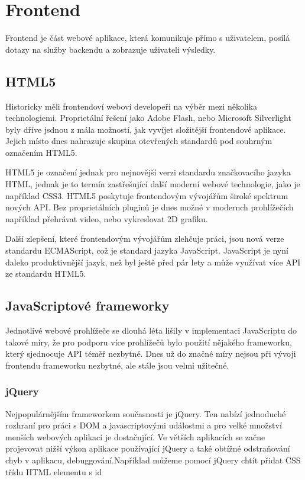 \chapter{Frontend}

Frontend je část webové aplikace, která komunikuje přímo s uživatelem, posílá dotazy na služby backendu a zobrazuje uživateli výsledky.

\section{HTML5}

Historicky měli frontendoví weboví developeři na výběr mezi několika technologiemi. Proprietální řešení jako Adobe Flash, nebo Microsoft Silverlight byly dříve jsdnou z mála možností, jak vyvíjet složitější frontendové aplikace. Jejich místo dnes nahrazuje skupina otevřených standardů pod souhrným označením HTML5.

HTML5 je označení jednak pro nejnovější verzi standardu značkovacího jazyka HTML, jednak je to termín zastřešující další moderní webové technologie, jako je například CSS3. HTML5 poskytuje frontendovým vývojářům široké spektrum nových API. Bez proprietálních pluginů je dnes možné v modernch prohlížečích například přehrávat video, nebo vykreslovat 2D grafiku.

Další zlepšení, které frontendovým vývojářům zlehčuje práci, jsou nová verze standardu ECMAScript, což je standard jazyka JavaScript. JavaScript je nyní daleko produktivnější jazyk, než byl ještě před pár lety a může využívat více API ze standardu HTML5.

\section{JavaScriptové frameworky}

Jednotlivé webové prohlížeče se dlouhá léta lišily v implementaci JavaScriptu do takové míry, že pro podporu více prohlížečů bylo použití nějakého frameworku, který sjednocuje API téměř nezbytné. Dnes už do značné míry nejsou při vývoji frontendu frameworku nezbytné, ale stále jsou velmi užitečné.

\subsection{jQuery}
Nejpopulárnějším frameworkem současnosti je jQuery. Ten nabízí jednoduché rozhraní pro práci s DOM a javascriptovými událostmi a pro velké množství menších webových aplikací je dostačující. Ve větších aplikacích se začne projevovat nižší výkon aplikace používající jQuery a také obtížné odstraňování chyb v aplikacu, debuggování.Například můžeme pomocí jQuery chtít přidat CSS třídu  HTML elementu s id 

